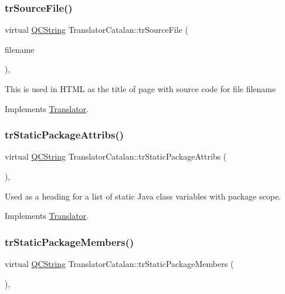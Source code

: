 \subsubsection{\texorpdfstring{trSourceFile()}{trSourceFile()}}
{\footnotesize\ttfamily virtual \mbox{\hyperlink{class_q_c_string}{Q\+C\+String}} Translator\+Catalan\+::tr\+Source\+File (\begin{DoxyParamCaption}\item[{\mbox{\hyperlink{class_q_c_string}{Q\+C\+String}} \&}]{filename }\end{DoxyParamCaption})\hspace{0.3cm}{\ttfamily [inline]}, {\ttfamily [virtual]}}

This is used in H\+T\+ML as the title of page with source code for file filename 

Implements \mbox{\hyperlink{class_translator}{Translator}}.

\mbox{\label{class_translator_catalan_a08dfb557bfc2f02675fee86ec65a160b}} 
\subsubsection{\texorpdfstring{trStaticPackageAttribs()}{trStaticPackageAttribs()}}
{\footnotesize\ttfamily virtual \mbox{\hyperlink{class_q_c_string}{Q\+C\+String}} Translator\+Catalan\+::tr\+Static\+Package\+Attribs (\begin{DoxyParamCaption}{ }\end{DoxyParamCaption})\hspace{0.3cm}{\ttfamily [inline]}, {\ttfamily [virtual]}}

Used as a heading for a list of static Java class variables with package scope. 

Implements \mbox{\hyperlink{class_translator}{Translator}}.

\mbox{\label{class_translator_catalan_a7d123760c2ba42351ca3e1292d37cbc0}} 
\subsubsection{\texorpdfstring{trStaticPackageMembers()}{trStaticPackageMembers()}}
{\footnotesize\ttfamily virtual \mbox{\hyperlink{class_q_c_string}{Q\+C\+String}} Translator\+Catalan\+::tr\+Static\+Package\+Members (\begin{DoxyParamCaption}{ }\end{DoxyParamCaption})\hspace{0.3cm}{\ttfamily [inline]}, {\ttfamily [virtual]}}

